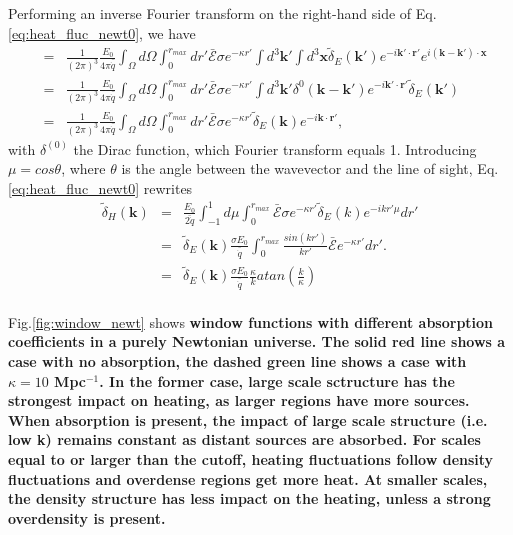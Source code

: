 \documentclass[twocolumns]{emulateapj}
\newcommand\ALc[1]{{\color{red} \bf #1}} %
\begin{document}
Performing an inverse Fourier transform on the right-hand side of Eq.\ref{eq:heat_fluc_newt0}, we have
\begin{eqnarray}
  \label{eq:right}
  &=& \frac{1}{(2\pi)^3} \frac{E_0}{4\pi\bar{\dot{q}}}\int_{\Omega}d\Omega\int_0^{r_{max}} dr'\bar{ \mathcal{E}}\sigma  e^{-\kappa r'} \int d^3\mathbf{k'}\int d^3\mathbf{x} \tilde{\delta}_E(\mathbf{k'})e^{-i\mathbf{k'}\cdot{\mathbf{r}'}} e^{i(\mathbf{k}-\mathbf{k'})\cdot\mathbf{x}} \\ \nonumber
  &=&\frac{1}{(2\pi)^3} \frac{E_0}{4\pi\bar{\dot{q}}} \int_{\Omega}d\Omega\int_0^{r_{max}}   dr' \bar{\mathcal{E}}\sigma  e^{-\kappa r'} \int d^3\mathbf{k'} \delta^{0}(\mathbf{k}-\mathbf{k}')e^{-i\mathbf{k'}\cdot{\mathbf{r}'}} \tilde{\delta}_E(\mathbf{k'})    \\ \nonumber
  &=&\frac{1}{(2\pi)^3} \frac{E_0}{4\pi\bar{\dot{q}}} \int_{\Omega}d\Omega\int_0^{r_{max}}  dr' \bar{ \mathcal{E}}\sigma  e^{-\kappa r'}  \tilde{\delta}_E(\mathbf{k}) e^{-i\mathbf{k}\cdot{\mathbf{r}'}}  ,
\end{eqnarray}
with $\delta^{(0)}$ the Dirac function, which Fourier transform equals 1. Introducing $\mu=cos\theta$, where $\theta$ is the angle between the wavevector and the line of sight, Eq. \ref{eq:heat_fluc_newt0} rewrites
\begin{eqnarray}
  \label{eq:heat_fluc_newt1}
  \tilde{\delta}_H(\mathbf{k})&=&  \frac{E_0}{\bar{2\dot{q}}} \int_{-1}^{1} d\mu \int_0^{r_{max}}  \bar{\mathcal{E}}\sigma  e^{-\kappa r'}  \tilde{\delta}_E(k) e^{-ikr'\mu}  dr'\\ \nonumber
&=&\tilde{\delta}_E(\mathbf{k})\frac{\sigma E_0}{\bar{\dot{q}}}\int_0^{r_{max}} \frac{sin(kr')}{kr'}   \bar{\mathcal{E}}  e^{-\kappa r'}   dr'.\\ \nonumber
&=&\tilde{\delta}_E(\mathbf{k})\frac{\sigma E_0}{ \bar{\dot{q}}}\frac{\kappa}{k}  atan\left(\frac{k}{\kappa}\right)\\ \nonumber
\end{eqnarray}

Fig.\ref{fig:window_newt} shows \ALc{ window functions with different absorption coefficients in a purely Newtonian universe. The solid red line shows a case with no absorption, the dashed green line shows a case with $\kappa=10$ Mpc$^{-1}$.  In the former case, large scale sctructure has the strongest impact on heating, as larger regions have more sources. When absorption is present,  the impact of large scale structure (i.e. low k) remains constant as distant sources are absorbed. For scales equal to or larger than the cutoff, heating fluctuations follow density fluctuations and overdense regions get more heat. At smaller scales, the density structure has less impact on the heating, unless a strong overdensity is present.  }
\end{document}
